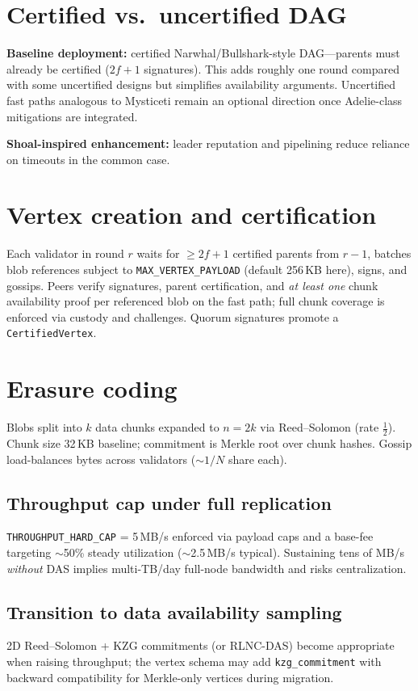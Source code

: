 \documentclass[11pt,a4paper,twoside]{report}
\theoremstyle{definition}
\begin{document}
\section{Certified vs.\ uncertified DAG}
\textbf{Baseline deployment:} certified Narwhal/Bullshark-style DAG---parents must already be certified ($2f{+}1$ signatures). This adds roughly one round compared with some uncertified designs but simplifies availability arguments. Uncertified fast paths analogous to Mysticeti remain an optional direction once Adelie-class mitigations are integrated.

\textbf{Shoal-inspired enhancement:} leader reputation and pipelining reduce reliance on timeouts in the common case.

\section{Vertex creation and certification}
Each validator in round $r$ waits for $\geq 2f{+}1$ certified parents from $r-1$, batches blob references subject to \texttt{MAX\_VERTEX\_PAYLOAD} (default 256\,KB here), signs, and gossips. Peers verify signatures, parent certification, and \emph{at least one} chunk availability proof per referenced blob on the fast path; full chunk coverage is enforced via custody and challenges. Quorum signatures promote a \texttt{CertifiedVertex}.

\section{Erasure coding}
Blobs split into $k$ data chunks expanded to $n=2k$ via Reed--Solomon (rate $\frac{1}{2}$). Chunk size 32\,KB baseline; commitment is Merkle root over chunk hashes. Gossip load-balances bytes across validators ($\sim 1/N$ share each).

\subsection{Throughput cap under full replication}
\texttt{THROUGHPUT\_HARD\_CAP} = 5\,MB/s enforced via payload caps and a base-fee targeting $\sim$50\% steady utilization ($\sim$2.5\,MB/s typical). Sustaining tens of MB/s \emph{without} DAS implies multi-TB/day full-node bandwidth and risks centralization.

\subsection{Transition to data availability sampling}
2D Reed--Solomon + KZG commitments (or RLNC-DAS) become appropriate when raising throughput; the vertex schema may add \texttt{kzg\_commitment} with backward compatibility for Merkle-only vertices during migration.
\end{document}

